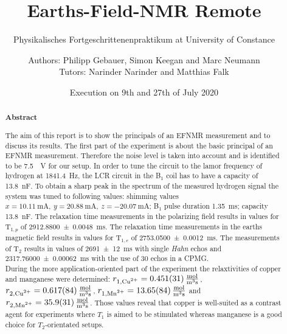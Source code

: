 \title{Earths-Field-NMR Remote}
\subtitle{Physikalisches Fortgeschrittenenpraktikum at University of Constance}
\author{Authors: Philipp Gebauer, Simon Keegan and Marc Neumann \\ \large{Tutors: Narinder Narinder and Matthias Falk}}
\date{Execution on 9th and 27th of July 2020}
\maketitle
\begin{abstract}
    \begin{center}
        \Large{\textsf{\textbf{Abstract}}}
    \end{center}
    \vspace{0.75 cm}
    \begin{singlespace}
    \noindent The aim of this report is to show the principals of an EFNMR measurement and to discuss its results.\newline
    The first part of the experiment is about the basic principal of an EFNMR measurement.
    Therefore the noise level is taken into account and is identified to be \SI{7.5}{\mu \volt} for our setup.
    In order to tune the circuit to the lamor frequency of hydrogen at \SI{1841.4}{\hertz}, the LCR circuit in the B$_1$ coil has to have a capacity of \SI{13.8}{\nano \farad}.
    To obtain a sharp peak in the spectrum of the measured hydrogen signal the system was tuned to following values: shimming values $x = \SI{10.11}{\milli \ampere}, \ y = \SI{20.88}{\milli \ampere}, \ z = \SI{-20.07}{\milli \ampere}$; B$_1$ pulse duration \SI{1.35}{\milli \second}; capacity \SI{13.8}{\nano \farad}.
    The relaxation time measurements in the polarizing field results in values for T$_{1,p}$ of \SI{2912.8800 \pm 0.0048}{\milli \second}.
    The relaxation time measurements in the earths magnetic field results in values for T$_{1,e}$ of \SI{2753.0500 \pm 0.0012}{\milli \second}.
    The measurements of T$_2$ results in values of \SI{2691 \pm 12}{\milli \second} with single \textit{Hahn} echos and \SI{2317.76000 \pm 0.00062}{\milli \second} with the use of 30 echos in a CPMG.\\
    During the more application-oriented part of the experiment the relaxtivities of copper and manganese were determined: $r_{1,\text{\ce{Cu^2+}}} = \SI{0.451 \pm 0.031}{\frac{\mol}{\metre \cubed \second}}$, $r_{2,\text{\ce{Cu^2+}}} = \SI{0.617 \pm 0.084}{\frac{\mol}{\metre \cubed \second}}$, $r_{1,\text{\ce{Mn^2+}}} = \SI{13.65 \pm 0.84}{\frac{\mol}{\metre \cubed \second}}$ and $r_{2,\text{\ce{Mn^2+}}} = \SI{35.9 \pm 3.1}{\frac{\mol}{\metre \cubed \second}}$. Those values reveal that copper is well-suited as a contrast agent for experiments where $T_1$ is aimed to be stimulated whereas manganese is a good choice for $T_2$-orientated setups.

\end{singlespace}
\end{abstract}

